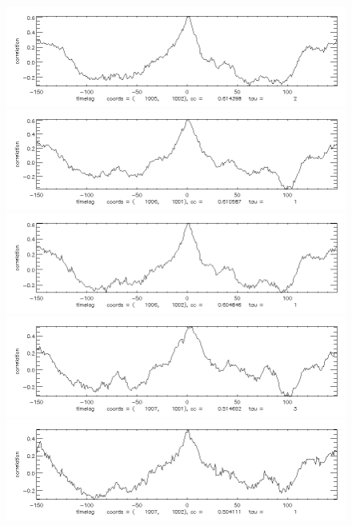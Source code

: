 \documentclass[12pt]{article}
\begin{document}
\begin{figure}[here]
\includegraphics[width=7in]{cc36.png}
\includegraphics[width=7in]{cc37.png}
\includegraphics[width=7in]{cc38.png}
\includegraphics[width=7in]{cc39.png}
\includegraphics[width=7in]{cc40.png}
\end{figure}
\end{document}
